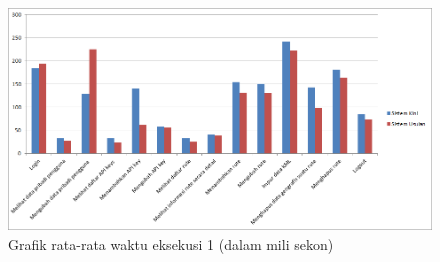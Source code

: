 
\begin{figure}[htbp]
	\centering
		\includegraphics[scale=0.6]{Gambar/5_pengujianwaktu_1.png}
	\caption{Grafik rata-rata waktu eksekusi 1 (dalam mili sekon)} 
	\label{fig:5_pengujianwaktu_1}
\end{figure}


